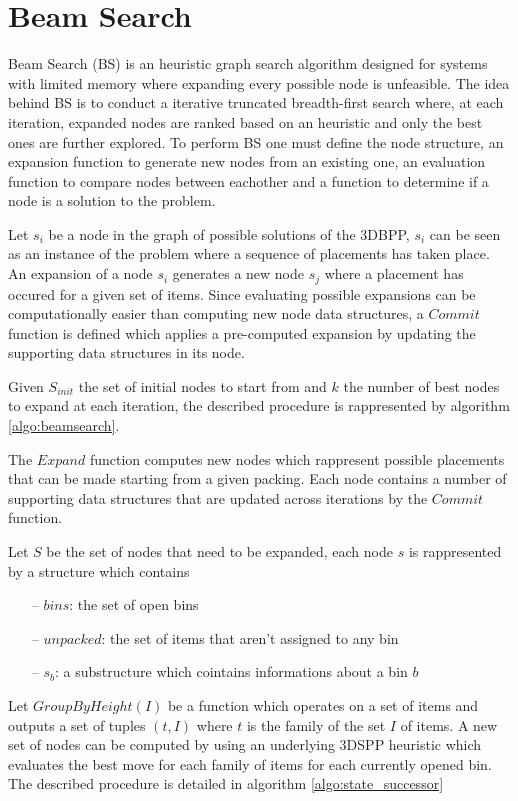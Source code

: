 \section{Beam Search}\label{chapter:heuristics:beamsearch}
Beam Search (BS) %
is an heuristic graph search algorithm designed for systems with limited memory where expanding every possible node is unfeasible.
The idea behind BS is to conduct a iterative truncated breadth-first search where, at each iteration, expanded nodes are ranked based on an heuristic and only the best ones are further explored.
To perform BS one must define the node structure, an expansion function to generate new nodes from an existing one, an evaluation function to compare nodes between eachother and a function to determine if a node is a solution to the problem.


Let $s_i$ be a node in the graph of possible solutions of the 3DBPP, %
$s_i$ can be seen as an instance of the problem where a sequence of placements has taken place.
An expansion of a node $s_i$ generates a new node $s_j$ where a placement has occured for a given set of items.
Since evaluating possible expansions can be computationally easier than computing new node data structures, %
a $Commit$ function is defined which applies a pre-computed expansion by updating the supporting data structures in its node.

Given $S_{init}$ the set of initial nodes to start from and $k$ the number of best nodes to expand at each iteration, the described procedure is rappresented by algorithm \ref{algo:beamsearch}.



The $Expand$ function computes new nodes which rappresent possible placements that can be made starting from a given packing.
Each node contains a number of supporting data structures that are updated across iterations by the $Commit$ function.

Let $S$ be the set of nodes that need to be expanded, each node $s$ is rappresented by a structure which contains
\begin{itemize}
    \item[--] $bins$: the set of open bins
    \item[--] $unpacked$: the set of items that aren't assigned to any bin
    \item[--] $s_b$: a substructure which cointains informations about a bin $b$
\end{itemize}
Let $GroupByHeight(I)$ be a function which operates on a set of items and outputs a set of tuples $(t, I)$ where $t$ is the family of the set $I$ of items. %
A new set of nodes can be computed by using an underlying 3DSPP heuristic which evaluates the best move for each family of items for each currently opened bin.
The described procedure is detailed in algorithm \ref{algo:state_successor}  

